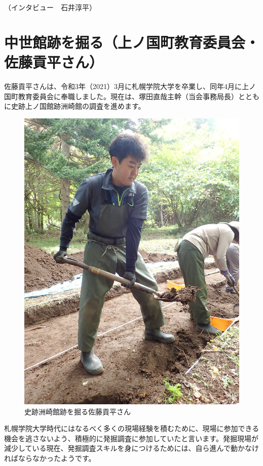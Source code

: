 \documentclass[a4j,11pt,twocolumn,openany]{jsbook}
\begin{document}
\hspace{8zw}（インタビュー　石井淳平）


\section{中世館跡を掘る（上ノ国町教育委員会・佐藤貢平さん）}

佐藤貢平さんは、令和3年（2021）3月に札幌学院大学を卒業し、同年4月に上ノ国町教育委員会に奉職しました。現在は、塚田直哉主幹（当会事務局長）とともに史跡上ノ国館跡洲崎館の調査を進めます。

\begin{figure}[ht]
	\centering
	\includegraphics[width=0.9\linewidth]{fig/06_satou/s_satou.JPG}
	\caption{史跡洲崎館跡を掘る佐藤貢平さん}
	\label{}
	\vspace{-1\baselineskip}
\end{figure}

札幌学院大学時代にはなるべく多くの現場経験を積むために、現場に参加できる機会を逃さないよう、積極的に発掘調査に参加していたと言います。発掘現場が減少している現在、発掘調査スキルを身につけるためには、自ら進んで動かなければならなかったようです。
\end{document}
